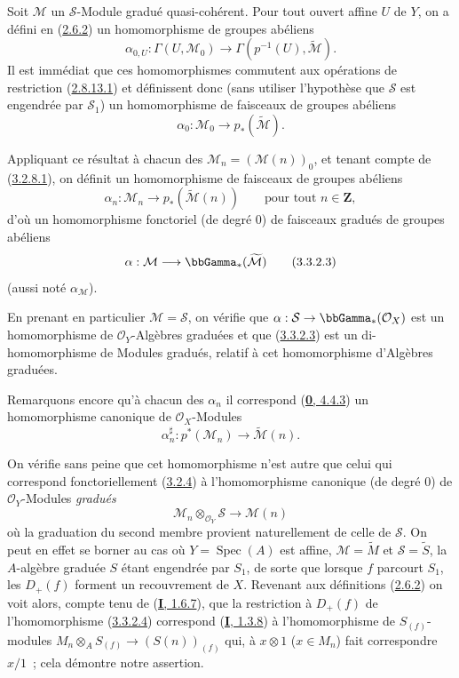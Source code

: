 \begin{env}[3.3.2]
\label{II.3.3.2-fr}
Soit $\mathcal{M}$ un $\mathcal{S}$-Module gradué quasi-cohérent. Pour tout
ouvert affine $U$ de $Y$, on a défini en
(\hyperref[II.2.6.2-fr]{2.6.2}) un homomorphisme de groupes abéliens
\[
  \alpha_{0,U}:\Gamma(U,\mathcal{M}_0)
  \longrightarrow\Gamma(p^{-1}(U),\widetilde{\mathcal{M}}).
\]
Il est immédiat que ces homomorphismes commutent aux opérations de restriction
(\hyperref[II.2.8.13.1-fr]{2.8.13.1}) et définissent donc (sans utiliser
l'hypothèse que $\mathcal{S}$ est engendrée par $\mathcal{S}_1$) un
homomorphisme de faisceaux de groupes abéliens
\[
\label{II.3.3.2.1-fr}
  \alpha_0:\mathcal{M}_0\longrightarrow p_*(\widetilde{\mathcal{M}}).
\tag{3.3.2.1}
\]

Appliquant ce résultat à chacun des
$\mathcal{M}_n=(\mathcal{M}(n))_0$, et tenant compte de
(\hyperref[II.3.2.8.1-fr]{3.2.8.1}), on définit un homomorphisme de faisceaux
de groupes abéliens
\[
\label{II.3.3.2.2-fr}
  \alpha_n:\mathcal{M}_n\longrightarrow
  p_*(\widetilde{\mathcal{M}}(n))
  \qquad\text{pour tout }n\in\mathbf{Z},
\tag{3.3.2.2}
\]
d'où un homomorphisme fonctoriel (de degré $0$) de faisceaux gradués de groupes
abéliens
\[
\label{II.3.3.2.3-fr}
  \alpha:\mathcal{M}\longrightarrow\bbGamma_*(\widetilde{\mathcal{M}})
\tag{3.3.2.3}
\]
(aussi noté $\alpha_{\mathcal{M}}$).

En prenant en particulier $\mathcal{M}=\mathcal{S}$, on vérifie que
$\alpha:\mathcal{S}\to\bbGamma_*(\mathcal{O}_X)$ est un homomorphisme de
$\mathcal{O}_Y$-Algèbres graduées et que
(\hyperref[II.3.3.2.3-fr]{3.3.2.3}) est un di-homomorphisme de Modules
gradués, relatif à cet homomorphisme d'Algèbres graduées.

Remarquons encore qu'à chacun des $\alpha_n$ il correspond
(\hyperref[0.4.4.3-fr]{\textbf{0}, 4.4.3}) un homomorphisme canonique de
$\mathcal{O}_X$-Modules
\[
\label{II.3.3.2.4-fr}
  \alpha_n^\sharp:p^*(\mathcal{M}_n)
  \longrightarrow\widetilde{\mathcal{M}}(n).
\tag{3.3.2.4}
\]

On vérifie sans peine que cet homomorphisme n'est autre que celui qui
correspond fonctoriellement (\hyperref[II.3.2.4-fr]{3.2.4}) à
l'homomorphisme canonique (de degré $0$) de $\mathcal{O}_Y$-Modules \emph{gradués}
\[
\label{II.3.3.2.5-fr}
  \mathcal{M}_n\otimes_{\mathcal{O}_Y}\mathcal{S}
  \longrightarrow\mathcal{M}(n)
\tag{3.3.2.5}
\]
où la graduation du second membre provient naturellement de celle de
$\mathcal{S}$. On peut en effet se borner au cas où
$Y=\operatorname{Spec}(A)$ est affine, $\mathcal{M}=\widetilde{M}$ et
$\mathcal{S}=\widetilde{S}$, la $A$-algèbre graduée $S$ étant engendrée par
$S_1$, de sorte que lorsque $f$ parcourt $S_1$, les $D_+(f)$ forment un
recouvrement de $X$. Revenant aux définitions
(\hyperref[II.2.6.2-fr]{2.6.2}) on voit alors, compte tenu de
(\hyperref[I.1.6.7-fr]{\textbf{I}, 1.6.7}), que la restriction à $D_+(f)$ de
l'homomorphisme (\hyperref[II.3.3.2.4-fr]{3.3.2.4}) correspond
(\hyperref[I.1.3.8-fr]{\textbf{I}, 1.3.8}) à l'homomorphisme de $S_{(f)}$-modules
$M_n\otimes_A S_{(f)}\to(S(n))_{(f)}$ qui, à $x\otimes1$ ($x\in M_n$) fait
correspondre $x/1$~; cela démontre notre assertion.
\end{env}


